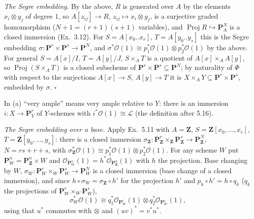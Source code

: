 \documentclass[11pt]{article}
\begin{document}
\emph{The Segre embedding.} By the above, $R$ is generated over $A$ by the elements $x_i\otimes y_j$ of degree $1$, so $A[z_{ij}]\to R$, $z_{ij}\mapsto x_i\otimes y_j$, is a surjective graded homomorphism ($N+1=(r+1)(s+1)$ variables), and $\operatorname{Proj}R\hookrightarrow\mathbf P^N_A$ is a closed immersion (Ex.\ 3.12). For $S=A[x_0..x_r]$, $T=A[y_0..y_s]$ this is the Segre embedding $\sigma:\mathbf P^r\times\mathbf P^s\to\mathbf P^N$, and $\sigma^*\mathcal O(1)\cong p_1^*\mathcal O(1)\otimes p_2^*\mathcal O(1)$ by the above. For general $S=A[x]/I$, $T=A[y]/J$, $S\times_AT$ is a quotient of $A[x]\times_AA[y]$, so $\operatorname{Proj}(S\times_AT)$ is a closed subscheme of $\mathbf P^r\times\mathbf P^s\subseteq\mathbf P^N$; by naturality of $\Phi$ with respect to the surjections $A[x]\to S$, $A[y]\to T$ it is $X\times_AY\subseteq\mathbf P^r\times\mathbf P^s$, embedded by $\sigma$. \hfill$\square$

\pf
In (a) ``very ample'' means very ample relative to $Y$: there is an immersion $i:X\to\mathbf P^r_Y$ of $Y$-schemes with $i^*\mathcal O(1)\cong\mathcal L$ (the definition after 5.16).

\emph{The Segre embedding over a base.} Apply Ex.\ 5.11 with $A=\mathbf Z$, $S=\mathbf Z[x_0,\dots,x_r]$, $T=\mathbf Z[y_0,\dots,y_s]$: there is a closed immersion $\sigma_{\mathbf Z}:\mathbf P^r_{\mathbf Z}\times_{\mathbf Z}\mathbf P^s_{\mathbf Z}\to\mathbf P^N_{\mathbf Z}$, $N=rs+r+s$, with $\sigma_{\mathbf Z}^*\mathcal O(1)\cong p_1^*\mathcal O(1)\otimes p_2^*\mathcal O(1)$. For any scheme $W$ put $\mathbf P^n_W=\mathbf P^n_{\mathbf Z}\times W$ and $\mathcal O_{\mathbf P^n_W}(1)=h^*\mathcal O_{\mathbf P^n_{\mathbf Z}}(1)$ with $h$ the projection. Base changing by $W$, $\sigma_W:\mathbf P^r_W\times_W\mathbf P^s_W\to\mathbf P^N_W$ is a closed immersion (base change of a closed immersion), and since $h\circ\sigma_W=\sigma_{\mathbf Z}\circ h'$ for the projection $h'$ and $p_k\circ h'=h\circ q_k$ ($q_k$ the projections of $\mathbf P^r_W\times_W\mathbf P^s_W$),
\[
\sigma_W^*\mathcal O(1)\cong q_1^*\mathcal O_{\mathbf P^r_W}(1)\otimes q_2^*\mathcal O_{\mathbf P^s_W}(1),
\]
using that $u^*$ commutes with $\otimes$ and $(uv)^*=v^*u^*$.
\end{document}

